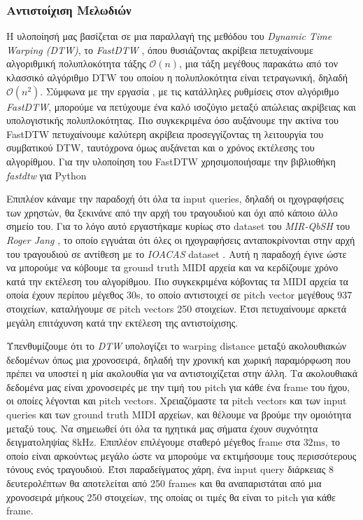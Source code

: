 \subsubsection{Αντιστοίχιση Μελωδιών}

Η υλοποίησή μας βασίζεται σε μια παραλλαγή της μεθόδου του \emph{Dynamic Time Warping (DTW)}, το \emph{FastDTW} \cite{salvador2007toward},
όπου θυσιάζοντας ακρίβεια πετυχαίνουμε αλγοριθμική πολυπλοκότητα τάξης $\mathcal{O}(n)$, μια τάξη μεγέθους παρακάτω από τον κλασσικό
αλγόριθμο DTW του οποίου η πολυπλοκότητα είναι τετραγωνική, δηλαδή $\mathcal{O}(n^2)$. Σύμφωνα με την εργασία \cite{salvador2007toward},
με τις κατάλληλες ρυθμίσεις στον αλγόριθμο \emph{FastDTW}, μπορούμε να πετύχουμε ένα καλό ισοζύγιο μεταξύ απώλειας ακρίβειας και
υπολογιστικής πολυπλοκότητας. Πιο συγκεκριμένα όσο αυξάνουμε την ακτίνα του FastDTW πετυχαίνουμε καλύτερη ακρίβεια προσεγγίζοντας τη λειτουργία του συμβατικού DTW, ταυτόχρονα όμως αυξάνεται και ο χρόνος εκτέλεσης του αλγορίθμου. Για την υλοποίηση του FastDTW χρησιμοποιήσαμε την βιβλιοθήκη \emph{fastdtw} για Python \cite{fastdtwpython}

Επιπλέον κάναμε την παραδοχή ότι όλα τα input queries, δηλαδή οι ηχογραφήσεις των
χρηστών, θα ξεκινάνε από την αρχή του τραγουδιού και όχι από κάποιο άλλο σημείο του. Για το λόγο αυτό εργαστήκαμε κυρίως στο dataset του
\emph{MIR-QbSH} του \emph{Roger Jang} \cite{jang-dataset}, το οποίο εγγυάται ότι όλες οι ηχογραφήσεις ανταποκρίνονται στην αρχή του
τραγουδιού σε αντίθεση με το \emph{IOACAS} dataset \cite{IOACAS-dataset}. Αυτή η παραδοχή έγινε ώστε να 
μπορούμε να κόβουμε τα ground truth MIDI αρχεία και να κερδίζουμε χρόνο κατά την εκτέλεση του αλγορίθμου. Πιο 
συγκεκριμένα κόβοντας τα MIDI αρχεία τα οποία έχουν περίπου μέγεθος 30s, το οποίο αντιστοιχεί σε pitch vector 
μεγέθους 937 στοιχείων, καταλήγουμε σε pitch vectors 250 στοιχείων. Έτσι πετυχαίνουμε αρκετά μεγάλη επιτάχυνση 
κατά την εκτέλεση της αντιστοίχισης. 

Υπενθυμίζουμε ότι το \emph{DTW} υπολογίζει το warping distance μεταξύ ακολουθιακών δεδομένων όπως μια χρονοσειρά, δηλαδή την χρονική και
χωρική παραμόρφωση που πρέπει να υποστεί η μία ακολουθία για να αντιστοιχίζεται στην άλλη. Τα ακολουθιακά δεδομένα μας είναι χρονοσειρές
με την τιμή του pitch για κάθε ένα frame του ήχου, οι οποίες λέγονται και pitch vectors. Χρειαζόμαστε τα pitch vectors και των input queries
και των ground truth MIDI αρχείων, και θέλουμε να βρούμε την ομοιότητα μεταξύ τους. Να σημειωθεί ότι όλα τα ηχητικά μας σήματα έχουν
συχνότητα δειγματοληψίας $8 \mathrm{ kHz}$. Επιπλέον επιλέγουμε σταθερό μέγεθος frame στα $32 \mathrm{ ms}$, το οποίο είναι αρκούντως
μεγάλο ώστε να μπορούμε να εκτιμήσουμε τους περισσότερους τόνους ενός τραγουδιού. Έτσι παραδείγματος χάρη, ένα input query διάρκειας 8
δευτερολέπτων θα αποτελείται από 250 frames και θα αναπαριστάται από μια χρονοσειρά μήκους 250 στοιχείων, της οποίας οι τιμές θα είναι το
pitch για κάθε frame.
